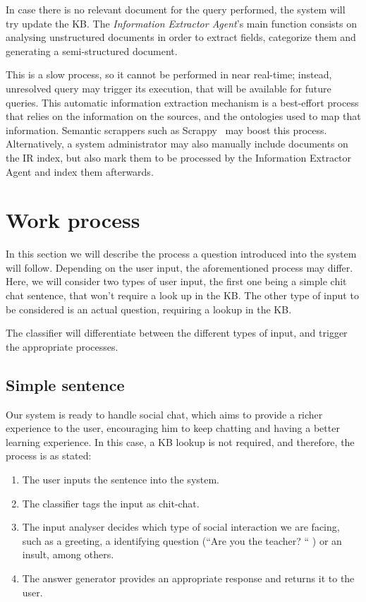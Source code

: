 In case there is no relevant document for the query performed, the system will try update the KB. The {\em Information Extractor Agent}'s main function consists on analysing unstructured documents in order to extract fields, categorize them and generating a semi-structured document. 

This is a slow process, so it cannot be performed in near real-time; instead, unresolved query may trigger its execution, that will be available for future queries. 
This automatic information extraction mechanism is a best-effort process that relies on the information on the sources, and the ontologies used to map that information. Semantic scrappers such as Scrappy~\cite{villamor13} may boost this process.
Alternatively, a system administrator may also manually include documents on the \ac{IR} index, but also mark them to be processed by the Information Extractor Agent and index them afterwards.

%
\section{Work process} %

In this section we will describe the process a question introduced into the system will follow. Depending on the user input, the aforementioned process may differ. Here, we will consider two types of user input, the first one being a simple chit chat sentence, that won't require a look up in the \ac{KB}. The other type of input to be considered is an actual question, requiring a lookup in the \ac{KB}.


The classifier will differentiate between the different types of input, and trigger the appropriate processes.

\subsection{Simple sentence}

Our system is ready to handle social chat, which aims to provide a richer experience to the user, encouraging him to keep chatting and having a better learning experience. In this case, a \ac{KB} lookup is not required, and therefore, the process is as stated:

\begin{enumerate}
 \item The user inputs the sentence into the system.
 \item The classifier tags the input as chit-chat.
 \item The input analyser decides which type of social interaction we are facing, such as a greeting, a identifying question (``Are you the teacher? `` ) or an insult, among others.
 \item The answer generator provides an appropriate response and returns it to the user.
\end{enumerate}

